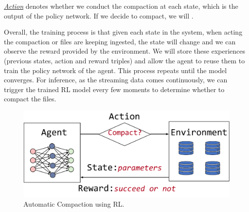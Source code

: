 \noindent \underline{\textit{Action}} denotes whether we conduct the compaction at each state, which is the output of the policy network. If we decide to compact, we will .


Overall, the training process is that given each state in the system, when acting the compaction or files are keeping ingested, the state will change and we can observe the reward provided by the environment. We will store these experiences (previous states, action  and reward triples) and allow the agent to reuse them to train the policy network of the agent.
This process repeats until the model converges. For inference, as the streaming data comes continuously, we can trigger the trained RL model every few moments to determine whether to  compact the files.






\begin{figure}[htbp]
	\includegraphics[scale=0.33]{figures/rl}
	\centering
	\vspace{-1.5em}
	\caption{Automatic Compaction using RL.}
	\label{fig:rl}
	\vspace{-1em}
\end{figure}


